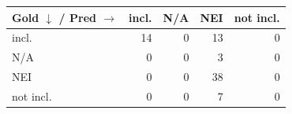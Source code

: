 \begin{tabular}{lrrrr}
\toprule
Gold $\downarrow$ / Pred $\rightarrow$ & incl. & N/A & NEI & not incl. \\
\midrule
incl. & 14 & 0 & 13 & 0 \\
N/A & 0 & 0 & 3 & 0 \\
NEI & 0 & 0 & 38 & 0 \\
not incl. & 0 & 0 & 7 & 0 \\
\bottomrule
\end{tabular}
